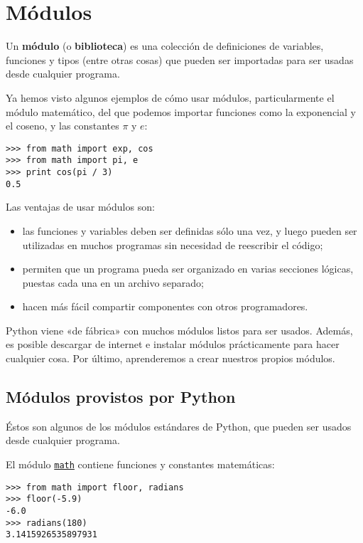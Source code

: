 \chapter{Módulos}

Un \textbf{módulo} (o \textbf{biblioteca}) es una colección de
definiciones de variables, funciones y tipos (entre otras cosas) que
pueden ser importadas para ser usadas desde cualquier programa.

Ya hemos visto algunos ejemplos de cómo usar módulos, particularmente el
módulo matemático, del que podemos importar funciones como la
exponencial y el coseno, y las constantes \(\pi\) y \(e\):

\begin{lstlisting}
>>> from math import exp, cos
>>> from math import pi, e
>>> print cos(pi / 3)
0.5
\end{lstlisting}

Las ventajas de usar módulos son:

\begin{itemize}
\item
  las funciones y variables deben ser definidas sólo una vez, y luego
  pueden ser utilizadas en muchos programas sin necesidad de reescribir
  el código;
\item
  permiten que un programa pueda ser organizado en varias secciones
  lógicas, puestas cada una en un archivo separado;
\item
  hacen más fácil compartir componentes con otros programadores.
\end{itemize}

Python viene «de fábrica» con muchos módulos listos para ser usados.
Además, es posible descargar de internet e instalar módulos
prácticamente para hacer cualquier cosa. Por último, aprenderemos a
crear nuestros propios módulos.

\section{Módulos provistos por Python}

Éstos son algunos de los módulos estándares de Python, que pueden ser
usados desde cualquier programa.

El módulo \href{http://docs.python.org/library/math.html}{\lstinline!math!} contiene
funciones y constantes matemáticas:

\begin{lstlisting}
>>> from math import floor, radians
>>> floor(-5.9)
-6.0
>>> radians(180)
3.1415926535897931
\end{lstlisting}

